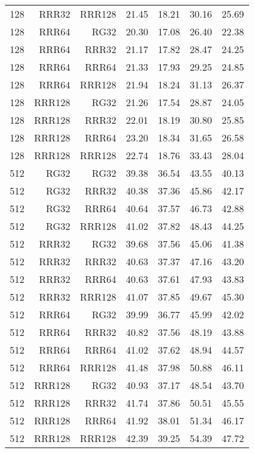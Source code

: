 \begin{table}
\begin{tabular}{|r|r|r|r|r|r|r|}
128 & RRR32 & RRR128 & 21.45 & 18.21 & 30.16 & 25.69 \\
128 & RRR64 & RG32 & 20.30 & 17.08 & 26.40 & 22.38 \\
128 & RRR64 & RRR32 & 21.17 & 17.82 & 28.47 & 24.25 \\
128 & RRR64 & RRR64 & 21.33 & 17.93 & 29.25 & 24.85 \\
128 & RRR64 & RRR128 & 21.94 & 18.24 & 31.13 & 26.37 \\
128 & RRR128 & RG32 & 21.26 & 17.54 & 28.87 & 24.05 \\
128 & RRR128 & RRR32 & 22.01 & 18.19 & 30.80 & 25.85 \\
128 & RRR128 & RRR64 & 23.20 & 18.34 & 31.65 & 26.58 \\
128 & RRR128 & RRR128 & 22.74 & 18.76 & 33.43 & 28.04 \\
512 & RG32 & RG32 & 39.38 & 36.54 & 43.55 & 40.13 \\
512 & RG32 & RRR32 & 40.38 & 37.36 & 45.86 & 42.17 \\
512 & RG32 & RRR64 & 40.64 & 37.57 & 46.73 & 42.88 \\
512 & RG32 & RRR128 & 41.02 & 37.82 & 48.43 & 44.25 \\
512 & RRR32 & RG32 & 39.68 & 37.56 & 45.06 & 41.38 \\
512 & RRR32 & RRR32 & 40.63 & 37.37 & 47.16 & 43.20 \\
512 & RRR32 & RRR64 & 40.63 & 37.61 & 47.93 & 43.83 \\
512 & RRR32 & RRR128 & 41.07 & 37.85 & 49.67 & 45.30 \\
512 & RRR64 & RG32 & 39.99 & 36.77 & 45.99 & 42.02 \\
512 & RRR64 & RRR32 & 40.82 & 37.56 & 48.19 & 43.88 \\
512 & RRR64 & RRR64 & 41.02 & 37.62 & 48.94 & 44.57 \\
512 & RRR64 & RRR128 & 41.48 & 37.98 & 50.88 & 46.11 \\
512 & RRR128 & RG32 & 40.93 & 37.17 & 48.54 & 43.70 \\
512 & RRR128 & RRR32 & 41.74 & 37.86 & 50.51 & 45.55 \\
512 & RRR128 & RRR64 & 41.92 & 38.01 & 51.34 & 46.17 \\
512 & RRR128 & RRR128 & 42.39 & 39.25 & 54.39 & 47.72 \\
\hline
\end{tabular}
\end{table}

